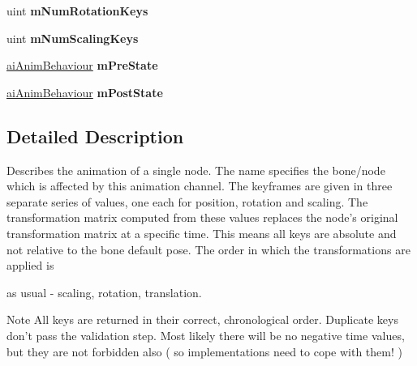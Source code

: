\begin{DoxyCompactItemize}
\item 
\hypertarget{structai_node_anim_aadbd135faa0908e3b793df70318d3b98}{uint {\bfseries m\+Num\+Rotation\+Keys}}\label{structai_node_anim_aadbd135faa0908e3b793df70318d3b98}

\item 
\hypertarget{structai_node_anim_a2c3c4f20c1fab303cb542e94b3cb41f7}{uint {\bfseries m\+Num\+Scaling\+Keys}}\label{structai_node_anim_a2c3c4f20c1fab303cb542e94b3cb41f7}

\item 
\hypertarget{structai_node_anim_a442a57fd1a7508fe3d088355c3714a3d}{\hyperlink{anim_8h_a201b9e9429b82cd6423ff4a4daf01cef}{ai\+Anim\+Behaviour} {\bfseries m\+Pre\+State}}\label{structai_node_anim_a442a57fd1a7508fe3d088355c3714a3d}

\item 
\hypertarget{structai_node_anim_a331ed6a78eb63917945faf29b4fb9cd6}{\hyperlink{anim_8h_a201b9e9429b82cd6423ff4a4daf01cef}{ai\+Anim\+Behaviour} {\bfseries m\+Post\+State}}\label{structai_node_anim_a331ed6a78eb63917945faf29b4fb9cd6}

\end{DoxyCompactItemize}


\subsection{Detailed Description}
Describes the animation of a single node. The name specifies the bone/node which is affected by this animation channel. The keyframes are given in three separate series of values, one each for position, rotation and scaling. The transformation matrix computed from these values replaces the node's original transformation matrix at a specific time. This means all keys are absolute and not relative to the bone default pose. The order in which the transformations are applied is
\begin{DoxyItemize}
\item as usual -\/ scaling, rotation, translation.
\end{DoxyItemize}

\begin{DoxyNote}{Note}
All keys are returned in their correct, chronological order. Duplicate keys don't pass the validation step. Most likely there will be no negative time values, but they are not forbidden also ( so implementations need to cope with them! ) 
\end{DoxyNote}


